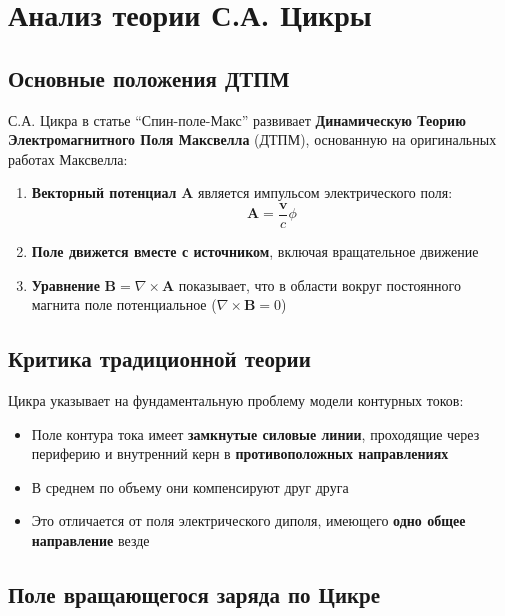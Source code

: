 \documentclass[12pt,a4paper]{article}
\begin{document}
\section{Анализ теории С.А. Цикры}

\subsection{Основные положения ДТПМ}

С.А. Цикра в статье ``Спин-поле-Макс'' развивает \textbf{Динамическую Теорию Электромагнитного Поля Максвелла} (ДТПМ), основанную на оригинальных работах Максвелла:

\begin{enumerate}
    \item \textbf{Векторный потенциал} $\mathbf{A}$ является импульсом электрического поля:
    \begin{equation}
        \mathbf{A} = \frac{\mathbf{v}}{c}\phi
    \end{equation}

    \item \textbf{Поле движется вместе с источником}, включая вращательное движение

    \item \textbf{Уравнение} $\mathbf{B} = \nabla \times \mathbf{A}$ показывает, что в области вокруг постоянного магнита поле потенциальное ($\nabla \times \mathbf{B} = 0$)
\end{enumerate}

\subsection{Критика традиционной теории}

Цикра указывает на фундаментальную проблему модели контурных токов:

\begin{itemize}
    \item Поле контура тока имеет \textbf{замкнутые силовые линии}, проходящие через периферию и внутренний керн в \textbf{противоположных направлениях}
    \item В среднем по объему они компенсируют друг друга
    \item Это отличается от поля электрического диполя, имеющего \textbf{одно общее направление} везде
\end{itemize}

\subsection{Поле вращающегося заряда по Цикре}
\end{document}
